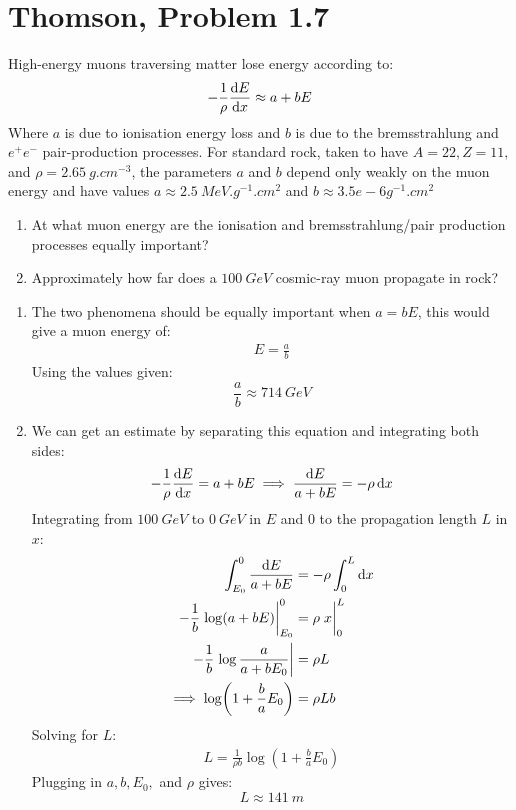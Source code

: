 \documentclass[12pt]{article}
\begin{document}
\section{Thomson, Problem 1.7}
\begin{problem}
  High-energy muons traversing matter lose energy according to:
  \begin{align*}
    -\frac1\rho\dv{E}{x}\approx a+bE
  \end{align*}
  Where $a$ is due to ionisation energy loss and $b$ is due to the bremsstrahlung and $e^+e^-$ pair-production processes. For standard rock, taken to have $A=22, Z=11,$ and $\rho=\SI{2.65}{g.cm^{-3}}$, the parameters $a$ and $b$ depend only weakly on the muon energy and have values $a\approx\SI{2.5}{MeV.g^{-1}.cm^{2}}$ and $b\approx{3.5e-6}{g^{-1}.cm^{2}}$
  \begin{enumerate}[label=\alph*)]
  \item At what muon energy are the ionisation and bremsstrahlung/pair production processes equally important?
  \item Approximately how far does a $\SI{100}{GeV}$ cosmic-ray muon propagate in rock?
  \end{enumerate}
\end{problem}
\begin{enumerate}[label=\alph*)]
\item The two phenomena should be equally important when $a=bE$, this would give a muon energy of:
  \begin{align*}
    E=\frac{a}{b}
  \end{align*}
  Using the values given:
  \begin{equation}
    \label{eq:p3a}
    \frac{a}{b}\approx\SI{714}{GeV}
  \end{equation}
\item We can get an estimate by separating this equation and integrating both sides:
  \begin{align*}
    -\frac1\rho\dv{E}{x}=a+bE\implies
    \frac{\dd{E}}{a+bE}=-\rho\dd{x}
  \end{align*}
  Integrating from $\SI{100}{GeV}$ to $\SI{0}{GeV}$ in $E$ and $0$ to the propagation length $L$ in $x$:
  \begin{align*}
    \int_{E_0}^0\frac{\dd{E}}{a+bE}&=-\rho\int_0^L\dd{x}\\
    -\frac1b\eval{\log(a+bE)}^0_{E_0}&=\rho\eval{x}_0^L\\
    -\frac1b\eval{\log\frac{a}{a+bE_0}}&=\rho L\\
    \implies\log(1+\frac{b}{a}E_0)&=\rho Lb
  \end{align*}
  Solving for $L$:
  \begin{align*}
    L=\frac1{\rho b}\log(1+\frac{b}{a}E_0)
  \end{align*}
  Plugging in $a,b,E_0,$ and $\rho$ gives:
  \begin{equation}
    \label{eq:p3b}
    \boxed{L\approx\SI{141}{m}}
  \end{equation}
\end{enumerate}
\end{document}
